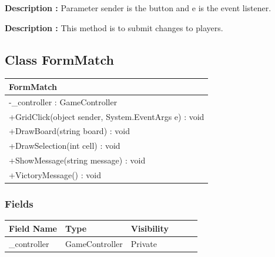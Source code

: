 \documentclass[12pt]{article}
\begin{document}
\textbf{Description :} Parameter sender is the button and e is the event listener.

\textbf{Description :} This method is to submit changes to players.

\newpage


\subsection{Class FormMatch}

\begin{table}[H]
    \begin{tabular}{|l|}
    \hline
    \rowcolor[HTML]{C0C0C0} 
    \textbf{FormMatch}                                   \\ \hline
    \rowcolor[HTML]{EFEFEF} 
    -\_controller : GameController                       \\ \hline
    \rowcolor[HTML]{FFFFFF} 
    +GridClick(object sender, System.EventArgs e) : void \\ \hline
    +DrawBoard(string board) : void                      \\ \hline
    +DrawSelection(int cell) : void                      \\ \hline
    +ShowMessage(string message) : void                  \\ \hline
    +VictoryMessage() : void                             \\ \hline
    \end{tabular}
\end{table}

\subsubsection{Fields}

\begin{table}[H]
    \begin{tabular}{llllll}
    \hline
    \multicolumn{1}{|l|}{\cellcolor[HTML]{EFEFEF}\textbf{Field Name}} & \multicolumn{1}{l|}{\cellcolor[HTML]{EFEFEF}\textbf{Type}} & \multicolumn{1}{l|}{\cellcolor[HTML]{EFEFEF}\textbf{Visibility}} \\ \hline
    \multicolumn{1}{|l|}{\_controller}                                & \multicolumn{1}{l|}{GameController}                        & \multicolumn{1}{l|}{Private}                                     \\ \hline
    \end{tabular}
\end{table}
\end{document}
